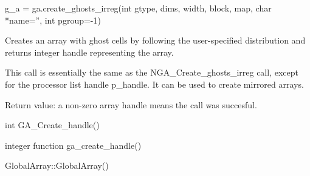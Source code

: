 \documentclass[10pt]{article}
\begin{document}
\begin{pyapi}
\begin{pycode}
g_a = ga.create_ghosts_irreg(int gtype, dims, width, block, map,
                             char *name='', int pgroup=-1)
\end{pycode}
\begin{funcargs}
\end{funcargs}
\end{pyapi}

\dcoll

\begin{desc}

Creates an array with ghost cells by following the user-specified distribution
and returns integer handle representing the array.

This call is essentially the same as the NGA_Create_ghosts_irreg call, except
for the processor list handle p_handle. It can be used to create mirrored
arrays.

Return value: a non-zero array handle means the call was succesful.

\end{desc}



\begin{capi}
\begin{ccode}
int GA_Create_handle()
\end{ccode}
\end{capi}

\begin{fapi}
\begin{fcode}
integer function ga_create_handle()
\end{fcode}
\end{fapi}

\begin{cxxapi}
\begin{cxxcode}
GlobalArray::GlobalArray()
\end{cxxcode}
\end{cxxapi}
\end{document}
